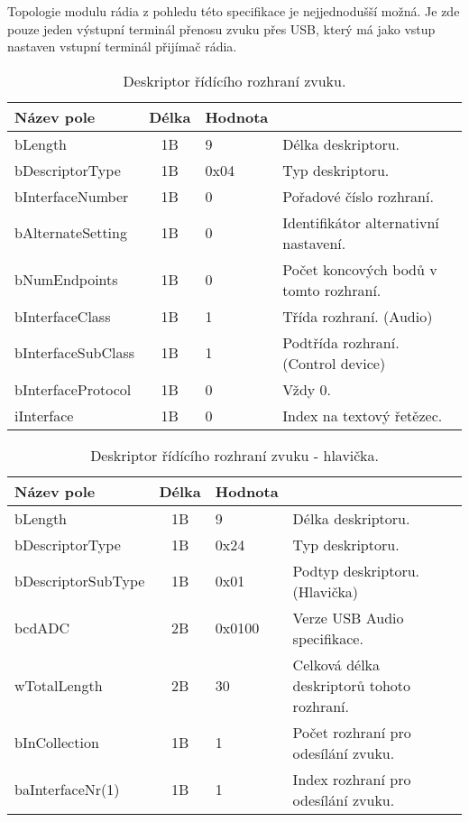 Topologie modulu rádia z pohledu této specifikace je nejjednodušší možná. Je zde pouze jeden výstupní terminál přenosu zvuku přes USB, který má jako vstup nastaven vstupní terminál přijímač rádia.


\begin{table}[t]
\begin{center}
\begin{tabular}{|l|c|l|l|}
\hline 
Název pole & Délka & Hodnota &  \\ 
\hline
bLength & 1B & 9 & Délka deskriptoru.\\
\hline
bDescriptorType & 1B & 0x04 & Typ deskriptoru. \\
\hline
bInterfaceNumber & 1B & 0 & Pořadové číslo rozhraní.\\
\hline
bAlternateSetting & 1B & 0 & Identifikátor alternativní nastavení.\\
\hline
bNumEndpoints & 1B & 0 & Počet koncových bodů v tomto rozhraní.\\
\hline
bInterfaceClass & 1B & 1 & Třída rozhraní. (Audio)\\
\hline
bInterfaceSubClass & 1B & 1 & Podtřída rozhraní. (Control device)\\
\hline
bInterfaceProtocol & 1B & 0 & Vždy 0. \\
\hline
iInterface & 1B & 0 & Index na textový řetězec.\\
\hline
\end{tabular} 
\end{center}
\caption{Deskriptor řídícího rozhraní zvuku.}
\label{tab:usb-aud-ctrl} 
\end{table}

\begin{table}[t]
\begin{center}
\begin{tabular}{|l|c|l|l|}
\hline 
Název pole & Délka & Hodnota &  \\ 
\hline
bLength & 1B & 9 & Délka deskriptoru.\\
\hline
bDescriptorType & 1B & 0x24 & Typ deskriptoru. \\
\hline
bDescriptorSubType & 1B & 0x01 & Podtyp deskriptoru. (Hlavička)\\
\hline
bcdADC & 2B & 0x0100 & Verze USB Audio specifikace.\\
\hline
wTotalLength & 2B & 30 & Celková délka deskriptorů tohoto rozhraní.\\
\hline
bInCollection & 1B & 1 & Počet rozhraní pro odesílání zvuku.\\
\hline
baInterfaceNr(1) & 1B & 1 & Index rozhraní pro odesílání zvuku.\\
\hline
\end{tabular}  
\end{center}
\caption{Deskriptor řídícího rozhraní zvuku - hlavička.}
\label{tab:usb-aud-ctrl-head} 
\end{table}


